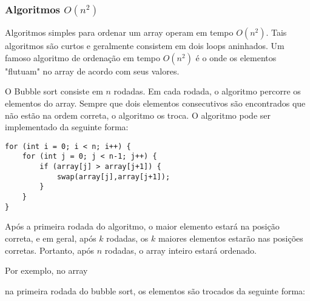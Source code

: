 \subsubsection{Algoritmos $O(n^2)$}


Algoritmos simples para ordenar um array
operam em tempo $O(n^2)$.
Tais algoritmos são curtos e geralmente
consistem em dois loops aninhados.
Um famoso algoritmo de ordenação em tempo $O(n^2)$
é o  onde os elementos
"flutuam" no array de acordo com seus valores.

O Bubble sort consiste em $n$ rodadas.
Em cada rodada, o algoritmo percorre
os elementos do array.
Sempre que dois elementos consecutivos são encontrados
que não estão na ordem correta,
o algoritmo os troca.
O algoritmo pode ser implementado da seguinte forma:
\begin{lstlisting}
for (int i = 0; i < n; i++) {
    for (int j = 0; j < n-1; j++) {
        if (array[j] > array[j+1]) {
            swap(array[j],array[j+1]);
        }
    }
}
\end{lstlisting}

Após a primeira rodada do algoritmo,
o maior elemento estará na posição correta,
e em geral, após $k$ rodadas, os $k$ maiores
elementos estarão nas posições corretas.
Portanto, após $n$ rodadas, o array inteiro
estará ordenado.

Por exemplo, no array

\begin{center}
\end{center}

\noindent
na primeira rodada do bubble sort, os elementos
são trocados da seguinte forma:

\begin{center}
\end{center}

